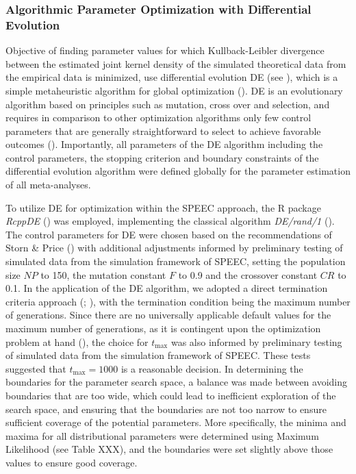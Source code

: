 \documentclass[
  12pt,
]{scrartcl}
\begin{document}
\subsubsection{Algorithmic Parameter Optimization with Differential
Evolution}\label{algorithmic-parameter-optimization-with-differential-evolution}

Objective of finding parameter values for which Kullback-Leibler
divergence between the estimated joint kernel density of the simulated
theoretical data from the empirical data is minimized, use differential
evolution DE (see ), which is a simple metaheuristic algorithm for global
optimization (). DE is an evolutionary algorithm based on principles such as
mutation, cross over and selection, and requires in comparison to other
optimization algorithms only few control parameters that are generally
straightforward to select to achieve favorable outcomes
().
Importantly, all parameters of the DE algorithm including the control
parameters, the stopping criterion and boundary constraints of the
differential evolution algorithm were defined globally for the parameter
estimation of all meta-analyses.

To utilize DE for optimization within the SPEEC approach, the R package
\emph{RcppDE} () was employed, implementing the classical algorithm
\emph{DE/rand/1} (). The control parameters for DE were chosen based on the
recommendations of Storn \& Price
() with additional
adjustments informed by preliminary testing of simulated data from the
simulation framework of SPEEC, setting the population size \(NP\) to
150, the mutation constant \(F\) to 0.9 and the crossover constant
\(CR\) to 0.1. In the application of the DE algorithm, we adopted a
direct termination criteria approach
(;
), with the
termination condition being the maximum number of generations. Since
there are no universally applicable default values for the maximum
number of generations, as it is contingent upon the optimization problem
at hand (), the
choice for \(t_{\text{max}}\) was also informed by preliminary testing
of simulated data from the simulation framework of SPEEC. These tests
suggested that \(t_{\text{max}} = 1000\) is a reasonable decision. In
determining the boundaries for the parameter search space, a balance was
made between avoiding boundaries that are too wide, which could lead to
inefficient exploration of the search space, and ensuring that the
boundaries are not too narrow to ensure sufficient coverage of the
potential parameters. More specifically, the minima and maxima for all
distributional parameters were determined using Maximum Likelihood (see
Table XXX), and the boundaries were set slightly above those values to
ensure good coverage.
\end{document}
